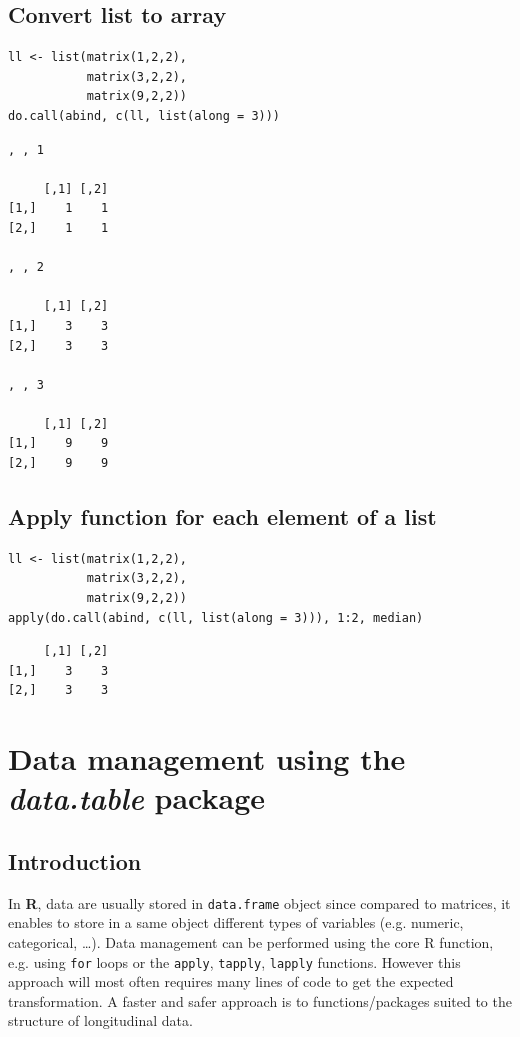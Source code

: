 \documentclass{article}
\newcommand\Rlogo{\textbf{\textsf{R}}\xspace}
\begin{document}
\subsection{Convert list to array}
\label{sec:orga690ebd}

\lstset{language=r,label= ,caption= ,captionpos=b,numbers=none}
\begin{lstlisting}
ll <- list(matrix(1,2,2),
		   matrix(3,2,2),
		   matrix(9,2,2))
do.call(abind, c(ll, list(along = 3)))
\end{lstlisting}

\begin{verbatim}
, , 1

     [,1] [,2]
[1,]    1    1
[2,]    1    1

, , 2

     [,1] [,2]
[1,]    3    3
[2,]    3    3

, , 3

     [,1] [,2]
[1,]    9    9
[2,]    9    9
\end{verbatim}

\subsection{Apply function for each element of a list}
\label{sec:orgf5bb046}


\lstset{language=r,label= ,caption= ,captionpos=b,numbers=none}
\begin{lstlisting}
ll <- list(matrix(1,2,2),
		   matrix(3,2,2),
		   matrix(9,2,2))
apply(do.call(abind, c(ll, list(along = 3))), 1:2, median)
\end{lstlisting}

\begin{verbatim}
     [,1] [,2]
[1,]    3    3
[2,]    3    3
\end{verbatim}

\section{Data management using the \emph{data.table} package}
\label{sec:orgfa073ed}
\subsection{Introduction}
\label{sec:org74ef859}
In \Rlogo, data are usually stored in \texttt{data.frame} object since compared
to matrices, it enables to store in a same object different types of
variables (e.g. numeric, categorical, \ldots{}). Data management can be
performed using the core R function, e.g. using \texttt{for} loops or
the \texttt{apply}, \texttt{tapply}, \texttt{lapply} functions.  However this approach will
most often requires many lines of code to get the expected
transformation.  A faster and safer approach is to functions/packages
suited to the structure of longitudinal data.
\end{document}
